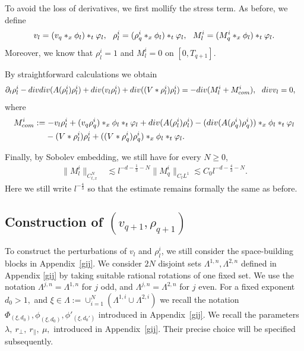 \documentclass[10pt,a4paper]{amsart}
\numberwithin{equation}{section}
\def\geq{\geqslant}
\def\div{\mathord{{\rm div}}}
\def\geq{\geqslant}
\def\div{\mathord{{\rm div}}}
\begin{document}
To avoid the loss of derivatives, we first mollify the stress term. As before, 
we define  
\begin{align}
v_l=(v_{q }*_x\phi_l)*_t\varphi_l,\ \ 
 \rho_l^i=(\rho_{q}^i*_x\phi_l)*_t\varphi_l,\ \ M_l^i=(M_{q }^i*_x\phi_l)*_t\varphi_l.\notag
\end{align}
Moreover,    we know that $ \rho_l^i=1 $ and $ M_l^i=0$ on $[0, T_{q+1}]$.
  
By straightforward calculations  we obtain 
\begin{align}
\partial_t \rho_l^i-\div\div(A(\rho_l^i)\rho_l^i)+\div(v_l \rho_l^i)+\div((V*\rho_l^i)\rho_l^i)&=-\div (M^i_l+M^i_{com}),\ \ \div v_l=0,\label{eq:6v_l}
\end{align} where
 \begin{align*}
M_{com}^i&:=-v_l \rho^i_l+(v_{q } \rho^i_{q})*_x\phi_l*_t\varphi_l+\div(A(\rho_l^i) \rho_l^i)-(\div(A(\rho_q^i) \rho_q^i))*_x\phi_l*_t\varphi_l\\
&\ \ \ \   -(V*\rho_l^i)\rho_l^i+((V*\rho_q^i)\rho_q^i)*_x\phi_l*_t\varphi_l.
\end{align*} 
 


Finally, by   Sobolev embedding, we still have for every $N\geq0$,
\begin{align*}
\|M_l^i\|_{C_{t,x}^N}
&\lesssim
l^{-d-\frac13-N}
\|M_q^i\|_{C_tL^1}
\lesssim
C_0l^{-d-\frac43-N}.
\end{align*}
Here we still write $l^{-\frac43}$ so that the estimate remains formally the same as before.
 
   


\subsection{Construction of $(v_{q+1},\rho_{q+1})$}\label{sec:6defq+1}
To construct the perturbations of $v_l$ and $\rho^i_l$, we  still consider the  space-building blocks in Appendix~\ref{gij}.   We consider $2N$ disjoint sets $\Lambda^{1,n}, \Lambda^{2,n}$ defined in Appendix \ref{gij} by taking suitable rational rotations of one fixed set. We use the notation   $ \Lambda^{j,n} =  \Lambda^{1,n}$ for $j$ odd, and $ \Lambda^{j,n} =  \Lambda^{2,n}$ for $j$ even. 
For a fixed exponent
$
d_0>1,
$ and $\xi\in\Lambda:=\cup_{i=1}^N(\Lambda^{1,i}\cup \Lambda^{2,i})$
we   recall the notation
$
\Phi_{(\xi,d_0)},
\phi_{(\xi,d_0)},
\phi'_{(\xi,d_0')}
$
introduced in Appendix~\ref{gij}. 
We  recall the parameters
$
\lambda,\ r_\perp,\ r_\parallel,\  \mu,
$
introduced in Appendix~\ref{gij}. Their precise choice will be specified subsequently.
\end{document}
